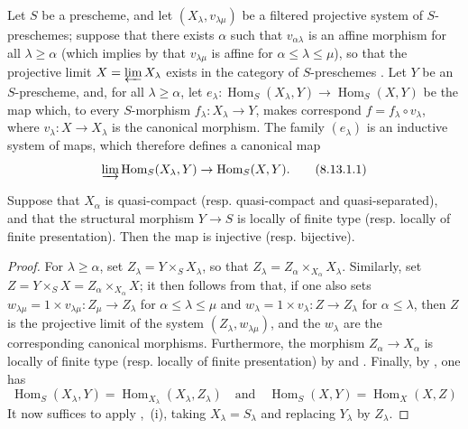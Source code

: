 \begin{proposition}[8.13.1]
\label{IV.8.13.1}
Let $S$ be a prescheme, and let $(X_\lambda,v_{\lambda\mu})$ be a filtered projective system of $S$-preschemes; suppose that there exists $\alpha$ such that $v_{\alpha\lambda}$ is an affine morphism for all $\lambda\geqslant\alpha$ (which implies by  that $v_{\lambda\mu}$ is affine for $\alpha\leqslant\lambda\leqslant\mu$), so that the projective limit $X=\varprojlim X_\lambda$ exists in the category of $S$-preschemes .
Let $Y$ be an $S$-prescheme, and, for all $\lambda\geqslant\alpha$, let $e_\lambda:\operatorname{Hom}_S(X_\lambda,Y)\to\operatorname{Hom}_S(X,Y)$ be the map which, to every $S$-morphism $f_\lambda:X_\lambda\to Y$, makes correspond $f=f_\lambda\circ v_\lambda$, where $v_\lambda:X\to X_\lambda$ is the canonical morphism.
The family $(e_\lambda)$ is an inductive system of maps, which therefore defines a canonical map
\begin{equation}
\label{IV.8.13.1.1}
\varinjlim\operatorname{Hom}_S(X_\lambda,Y)\to\operatorname{Hom}_S(X,Y). \tag{8.13.1.1}
\end{equation}

Suppose that $X_\alpha$ is quasi-compact (\textup{resp.} quasi-compact and quasi-separated), and that the structural morphism $Y\to S$ is locally of finite type (\textup{resp.} locally of finite presentation).
Then the map  is injective (\textup{resp.} bijective).
\end{proposition}

\begin{proof}
For $\lambda\geqslant\alpha$, set $Z_\lambda=Y\times_S X_\lambda$, so that $Z_\lambda=Z_\alpha\times_{X_\alpha}X_\lambda$.
Similarly, set $Z=Y\times_S X=Z_\alpha\times_{X_\alpha}X$; it then follows from  that, if one also sets $w_{\lambda\mu}=1\times v_{\lambda\mu}:Z_\mu\to Z_\lambda$ for $\alpha\leqslant\lambda\leqslant\mu$ and $w_\lambda=1\times v_\lambda:Z\to Z_\lambda$ for $\alpha\leqslant\lambda$, then $Z$ is the projective limit of the system $(Z_\lambda,w_{\lambda\mu})$, and the $w_\lambda$ are the corresponding canonical morphisms.
Furthermore, the morphism $Z_\alpha\to X_\alpha$ is locally of finite type (resp. locally of finite presentation) by  and .
Finally, by , one has
\[
\operatorname{Hom}_S(X_\lambda,Y)=\operatorname{Hom}_{X_\lambda}(X_\lambda,Z_\lambda) \quad\text{and}\quad \operatorname{Hom}_S(X,Y)=\operatorname{Hom}_X(X,Z)
\]
It now suffices to apply ,~(i), taking $X_\lambda=S_\lambda$ and replacing $Y_\lambda$ by $Z_\lambda$.
\end{proof}

